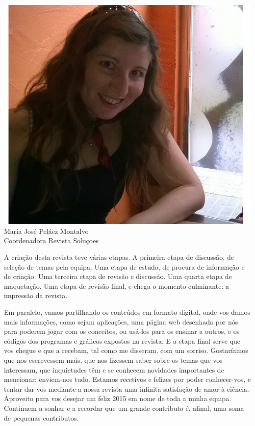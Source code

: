 \begin{multicols}{2}
  \begin{figurebox}
       \centering
  \includegraphics[scale=0.29]{maria.png}\\
    María José Peláez Montalvo\\ 
    {\small Coordenadora Revista Soluçoes}\\
    \vspace{1pt}
  \end{figurebox}
\vspace{1cm}

A criação desta revista teve várias etapas. A primeira etapa de
discussão, de seleção de temas pela equipa. Uma etapa de estudo, de
procura de informação e de criação. Uma terceira etapa de revisão e
discussão. Uma quarta etapa de maquetação. Uma etapa de revisão final,
e chega o momento culminante: a impressão da revista.

Em paralelo, vamos partilhando os conteúdos em formato digital, onde
vos damos mais informações, como sejam aplicações, uma página web
desenhada por nós para poderem jogar com os conceitos, ou usá-los para
os ensinar a outros, e os códigos dos programas e gráficos expostos na
revista. E a etapa final serve que vos chegue e que a recebam, tal
como me disseram, com um sorriso.  Gostaríamos que nos escrevessem
mais, que nos fizessem saber sobre os temas que vos interessam, que
inquietudes têm e se conhecem novidades importantes de mencionar:
enviem-nos tudo. Estamos recetivos e felizes por poder conhecer-vos, e
tentar dar-vos mediante a nossa revista uma infinita satisfação de
amor à ciência.  Aproveito para vos desejar um feliz 2015 em nome de
toda a minha equipa. Continuem a sonhar e a recordar que um grande
contributo é, afinal, uma soma de pequenas contributos.


\end{multicols}
